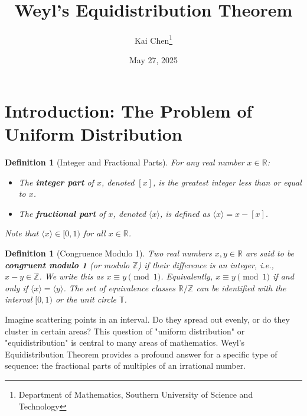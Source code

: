 \documentclass[12pt]{article}
\title{Weyl's Equidistribution Theorem}
\author{Kai Chen\thanks{Department of Mathematics, Southern University of Science and Technology}}
\date{May 27, 2025}
\newtheorem{definition}[theorem]{Definition}
\newcommand{\R}{\mathbb{R}}
\newcommand{\Z}{\mathbb{Z}}
\newcommand{\T}{\mathbb{T}} %
\begin{document}
\maketitle

\section{Introduction: The Problem of Uniform Distribution}

\begin{definition}[Integer and Fractional Parts]
For any real number $x \in \R$:
\begin{itemize}
    \item The \textbf{integer part} of $x$, denoted $[x]$, is the greatest integer less than or equal to $x$.
    \item The \textbf{fractional part} of $x$, denoted $\langle x \rangle$, is defined as $\langle x \rangle = x - [x]$.
\end{itemize}
Note that $\langle x \rangle \in [0,1)$ for all $x \in \R$.
\end{definition}

\begin{definition}[Congruence Modulo 1]
Two real numbers $x, y \in \R$ are said to be \textbf{congruent modulo 1} (or modulo $\Z$) if their difference is an integer, i.e., $x - y \in \Z$. We write this as $x \equiv y \pmod{1}$.
Equivalently, $x \equiv y \pmod{1}$ if and only if $\langle x \rangle = \langle y \rangle$.
The set of equivalence classes $\R/\Z$ can be identified with the interval $[0,1)$ or the unit circle $\T$.
\end{definition}

Imagine scattering points in an interval. Do they spread out evenly, or do they cluster in certain areas? This question of "uniform distribution" or "equidistribution" is central to many areas of mathematics. Weyl's Equidistribution Theorem provides a profound answer for a specific type of sequence: the fractional parts of multiples of an irrational number.
\end{document}
